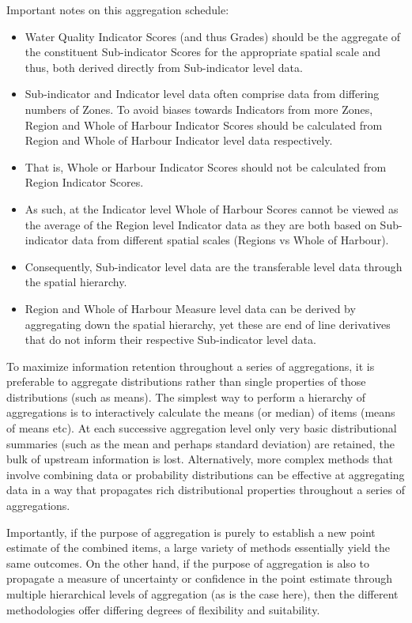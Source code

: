 \documentclass[
  8pt,
  a4paper]{article}
\providecommand{\tightlist}{%
  \setlength{\itemsep}{0pt}\setlength{\parskip}{0pt}}
\begin{document}
Important notes on this aggregation schedule:

\begin{itemize}
\tightlist
\item
  Water Quality Indicator Scores (and thus Grades) should be the
  aggregate of the constituent Sub-indicator Scores for the appropriate
  spatial scale and thus, both derived directly from Sub-indicator level
  data.
\item
  Sub-indicator and Indicator level data often comprise data from
  differing numbers of Zones. To avoid biases towards Indicators from
  more Zones, Region and Whole of Harbour Indicator Scores should be
  calculated from Region and Whole of Harbour Indicator level data
  respectively.
\item
  That is, Whole or Harbour Indicator Scores should not be calculated
  from Region Indicator Scores.
\item
  As such, at the Indicator level Whole of Harbour Scores cannot be
  viewed as the average of the Region level Indicator data as they are
  both based on Sub-indicator data from different spatial scales
  (Regions vs Whole of Harbour).
\item
  Consequently, Sub-indicator level data are the transferable level data
  through the spatial hierarchy.
\item
  Region and Whole of Harbour Measure level data can be derived by
  aggregating down the spatial hierarchy, yet these are end of line
  derivatives that do not inform their respective Sub-indicator level
  data.
\end{itemize}

To maximize information retention throughout a series of aggregations,
it is preferable to aggregate distributions rather than single
properties of those distributions (such as means). The simplest way to
perform a hierarchy of aggregations is to interactively calculate the
means (or median) of items (means of means etc). At each successive
aggregation level only very basic distributional summaries (such as the
mean and perhaps standard deviation) are retained, the bulk of upstream
information is lost. Alternatively, more complex methods that involve
combining data or probability distributions can be effective at
aggregating data in a way that propagates rich distributional properties
throughout a series of aggregations.

Importantly, if the purpose of aggregation is purely to establish a new
point estimate of the combined items, a large variety of methods
essentially yield the same outcomes. On the other hand, if the purpose
of aggregation is also to propagate a measure of uncertainty or
confidence in the point estimate through multiple hierarchical levels of
aggregation (as is the case here), then the different methodologies
offer differing degrees of flexibility and suitability.
\end{document}
